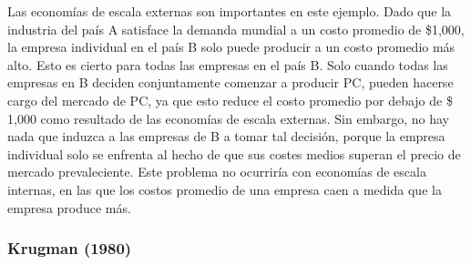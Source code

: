 Las economías de escala externas son importantes en este ejemplo. Dado que la industria del país A satisface la demanda mundial a un costo promedio de \$1,000, la empresa individual en el país B solo puede producir a un costo promedio más alto. Esto es cierto para todas las empresas en el país B. Solo cuando todas las empresas en B deciden conjuntamente comenzar a producir PC, pueden hacerse cargo del mercado de PC, ya que esto reduce el costo promedio por debajo de \$ 1,000 como resultado de las economías de escala externas. Sin embargo, no hay nada que induzca a las empresas de B a tomar tal decisión, porque la empresa individual solo se enfrenta al hecho de que sus costes medios superan el precio de mercado prevaleciente. Este problema no ocurriría con economías de escala internas, en las que los costos promedio de una empresa caen a medida que la empresa produce más.

\subsubsection{Krugman (1980)}

